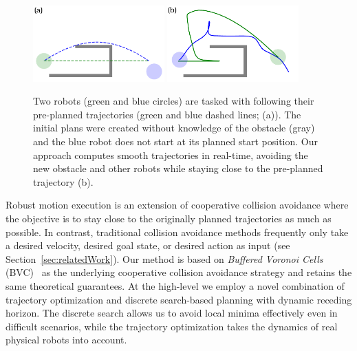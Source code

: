 \documentclass{svproc}
\begin{document}
\begin{figure}
\includegraphics[width=0.45\textwidth]{images/swap2_initial.pdf}
\hfill
\includegraphics[width=0.45\textwidth]{images/swap2_final.pdf}
\caption{Two robots (green and blue circles) are tasked with following their pre-planned trajectories (green and blue dashed lines; (a)).
The initial plans were created without knowledge of the obstacle (gray) and the blue robot does not start at its planned start position.
Our approach computes smooth trajectories in real-time, avoiding the new obstacle and other robots while staying close to the pre-planned trajectory (b).
}
\label{fig:swap2}
\end{figure}

Robust motion execution is an extension of cooperative collision avoidance where the objective is to stay close to the originally planned trajectories as much as possible.
In contrast, traditional collision avoidance methods frequently only take a desired velocity, desired goal state, or desired action as input (see Section~\ref{sec:relatedWork}).
Our method is based on \emph{Buffered Voronoi Cells} (BVC)~\cite{bufferedVoronoiCells} as the underlying cooperative collision avoidance strategy and retains the same theoretical guarantees.
At the high-level we employ a novel combination of trajectory optimization and discrete search-based planning with dynamic receding horizon.
The discrete search allows us to avoid local minima effectively even in difficult scenarios, while the trajectory optimization takes the dynamics of real physical robots into account.
\end{document}
